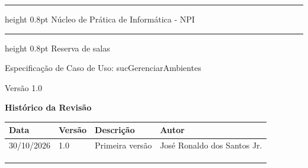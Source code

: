 \documentclass[12pt,a4paper]{article}
\newcommand{\ucnome}{sucGerenciarAmbientes}
\newcommand{\ucprojeto}{Reserva de salas}
\newcommand{\ucversao}{1.0}
\newcommand{\ucdata}{30/10/2026}
\newcommand{\ucautor}{José Ronaldo dos Santos Jr.}
\newcommand{\ucorgao}{Núcleo de Prática de Informática - NPI}
\newcommand{\uctitulo}{Especificação de Caso de Uso: \ucnome}
\begin{document}

\thispagestyle{empty}
\vspace*{-3.3cm}
{\bfseries
  \hrule height 0.8pt
  \vspace{10pt}
  \raggedleft \Large \ucorgao \par
  \vspace{10pt}
  \hrule height 0.8pt
  \vspace{36pt}
  \raggedleft \Large \ucprojeto \par
  \vspace{12pt}
  \raggedleft \Large \uctitulo \par
  \vspace{36pt}
  \raggedleft \large Versão \ucversao \par
}
\newpage


\begin{center}
  {\Large\bfseries Histórico da Revisão}
\end{center}

\vspace{\baselineskip}

{\small
\noindent
\begin{tabularx}{\textwidth}{|p{2.6cm}|p{1.6cm}|X|p{3.6cm}|}
  \hline
  \centering\textbf{Data} & \centering\textbf{Versão} & \centering\textbf{Descrição}
    & \centering\arraybackslash\textbf{Autor} \\
  \hline
  \ucdata & \ucversao & Primeira versão & \ucautor \\
  \hline
  & & & \\
  \hline
  & & & \\
  \hline
  & & & \\
  \hline
\end{tabularx}
\par}

\vspace{\baselineskip}

{\tableofcontents\par}
\thispagestyle{fancy}
\newpage
\end{document}
